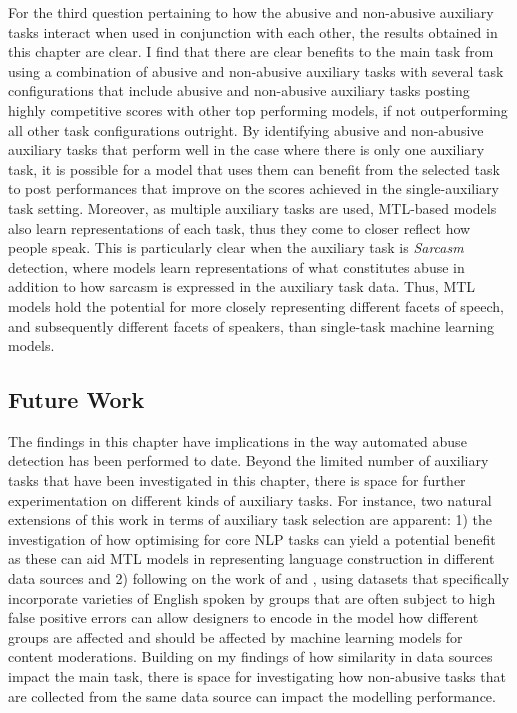 For the third question pertaining to how the abusive and non-abusive auxiliary tasks interact when used in conjunction with each other, the results obtained in this chapter are clear.
I find that there are clear benefits to the main task from using a combination of abusive and non-abusive auxiliary tasks with several task configurations that include abusive and non-abusive auxiliary tasks posting highly competitive scores with other top performing models, if not outperforming all other task configurations outright.
By identifying abusive and non-abusive auxiliary tasks that perform well in the case where there is only one auxiliary task, it is possible for a model that uses them can benefit from the selected task to post performances that improve on the scores achieved in the single-auxiliary task setting.
Moreover, as multiple auxiliary tasks are used, MTL-based models also learn representations of each task, thus they come to closer reflect how people speak.
This is particularly clear when the auxiliary task is \textit{Sarcasm} detection, where models learn representations of what constitutes abuse in addition to how sarcasm is expressed in the auxiliary task data.
Thus, MTL models hold the potential for more closely representing different facets of speech, and subsequently different facets of speakers, than single-task machine learning models.

\subsection{Future Work}
The findings in this chapter have implications in the way automated abuse detection has been performed to date.
Beyond the limited number of auxiliary tasks that have been investigated in this chapter, there is space for further experimentation on different kinds of auxiliary tasks.
For instance, two natural extensions of this work in terms of auxiliary task selection are apparent: 1) the investigation of how optimising for core NLP tasks can yield a potential benefit as these can aid MTL models in representing language construction in different data sources and 2) following on the work of \citet{Davidson:2019} and \citet{Dias:2021}, using datasets that specifically incorporate varieties of English spoken by groups that are often subject to high false positive errors can allow designers to encode in the model how different groups are affected and should be affected by machine learning models for content moderations.
Building on my findings of how similarity in data sources impact the main task, there is space for investigating how non-abusive tasks that are collected from the same data source can impact the modelling performance.

